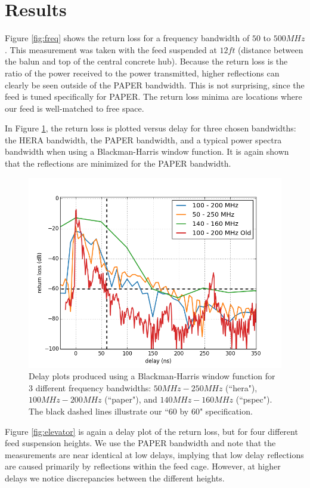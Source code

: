 \documentclass[12pt,preprint]{aastex}
\begin{document}
\section{Results}

Figure \ref{fig:freq} shows the return loss for a frequency bandwidth of $50$ to $500MHz$. This measurement was taken with the feed suspended at $12ft$ (distance between the balun and top of the central concrete hub). Because the return loss is the ratio of the power received to the power transmitted, higher reflections can clearly be seen outside of the PAPER bandwidth. This is not surprising, since the feed is tuned specifically for PAPER. The return loss minima are locations where our feed is well-matched to free space.

In Figure \ref{fig:3bands}, the return loss is plotted versus delay for three chosen bandwidths: the HERA bandwidth, the PAPER bandwidth, and a typical power spectra bandwidth when using a Blackman-Harris window function. It is again shown that the reflections are minimized for the PAPER bandwidth. 

\begin{figure}
\centering
\includegraphics[totalheight=0.4\textheight]{plots/delay3_window.png}
\caption{Delay plots produced using a Blackman-Harris window function for 3 different frequency bandwidths: $50MHz-250MHz$ (``hera"), $100MHz-200MHz$ (``paper"), and $140MHz-160MHz$ (``pspec"). The black dashed lines illustrate our ``60 by 60" specification.}
\label{fig:3bands}
\end{figure}

Figure \ref{fig:elevator} is again a delay plot of the return loss, but for four different feed suspension heights. We use the PAPER bandwidth and note that the measurements are near identical at low delays, implying that low delay reflections are caused primarily by reflections within the feed cage. However, at higher delays we notice discrepancies between the different heights.
\end{document}

